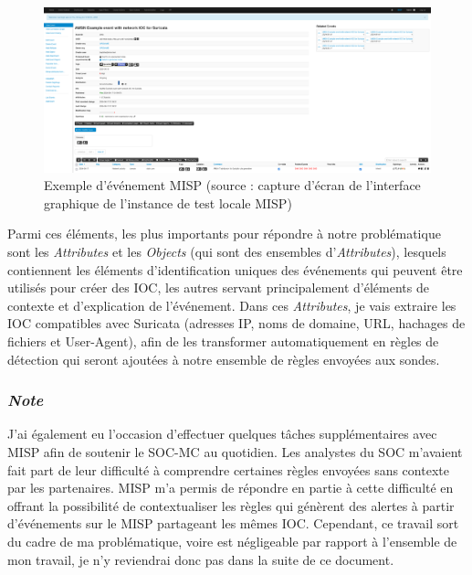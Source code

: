 \newpage

\begin{figure}[h]%
    \center%
    \includegraphics[width=1\textwidth]{assets/CaptureMisp.png}
    \caption[Exemple d'événement MISP (source : capture d'écran de l'interface graphique de l'instance de test locale MISP)]{Exemple d'événement MISP (source : capture d'écran de l'interface graphique de l'instance de test locale MISP)}\label{fig:CaptureMisp}
\end{figure}

\vspace{1em}

Parmi ces éléments, les plus importants pour répondre à notre problématique sont les \textit{Attributes} et les \textit{Objects} (qui sont des ensembles d'\textit{Attributes}), lesquels contiennent les éléments d'identification uniques des événements qui peuvent être utilisés pour créer des IOC, les autres servant principalement d'éléments de contexte et d'explication de l'événement. Dans ces \textit{Attributes}, je vais extraire les IOC compatibles avec Suricata (adresses IP, noms de domaine, URL, hachages de fichiers et User-Agent), afin de les transformer automatiquement en règles de détection qui seront ajoutées à notre ensemble de règles envoyées aux sondes.\\

\subsubsection{\textit{Note}}
J'ai également eu l'occasion d'effectuer quelques tâches supplémentaires avec MISP afin de soutenir le SOC-MC au quotidien. Les analystes du SOC m'avaient fait part de leur difficulté à comprendre certaines règles envoyées sans contexte par les partenaires. MISP m'a permis de répondre en partie à cette difficulté en offrant la possibilité de contextualiser les règles qui génèrent des alertes à partir d'événements sur le MISP partageant les mêmes IOC. Cependant, ce travail sort du cadre de ma problématique, voire est négligeable par rapport à l'ensemble de mon travail, je n'y reviendrai donc pas dans la suite de ce document.

